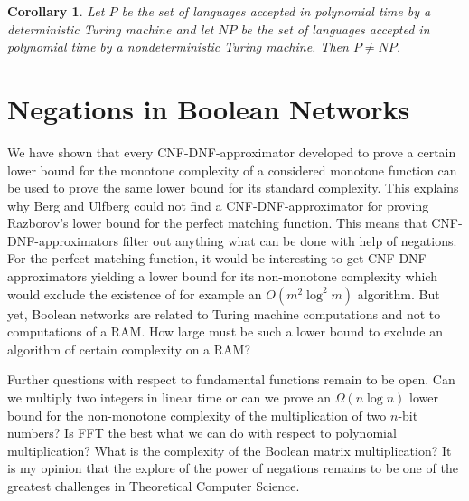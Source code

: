 \documentclass[11pt]{article}
\newtheorem{coro}{Corollary}
\begin{document}
\begin{coro}
  Let $P$ be the set of languages accepted in polynomial time by a deterministic Turing machine
  and let $NP$ be the set of languages accepted in polynomial time by a nondeterministic Turing machine.
  Then $P \not= NP$.
\end{coro}


\section{Negations in Boolean Networks}

We have shown that every CNF-DNF-approximator developed to prove a certain lower bound for
the monotone complexity of a considered monotone function can be used to prove the same lower bound
for its standard complexity. This explains why Berg and Ulfberg \cite{BeUl} could not find
a CNF-DNF-approximator for proving Razborov's lower bound for the perfect matching function.
This means that CNF-DNF-approximators filter out anything what can be done with help of negations.
For the perfect matching function, it would be interesting to get
CNF-DNF-approximators yielding a lower bound for its non-monotone complexity which would
exclude the existence of for example an $O(m^2\log^2 m)$ algorithm. But yet, Boolean networks are related
to Turing machine computations and not to computations of a RAM. How large must be such a lower
bound to exclude an algorithm of certain complexity on a RAM?

Further questions with respect to fundamental functions remain to be open. Can we multiply two integers
in linear time or can we prove an $\Omega(n \log n)$ lower bound for the non-monotone complexity
of the multiplication of two $n$-bit numbers? Is FFT the best what we can do with respect to polynomial
multiplication? What is the complexity of the Boolean matrix multiplication?
It is my opinion that the explore of the power of negations remains to be one of the greatest
challenges in Theoretical Computer Science.
\end{document}
